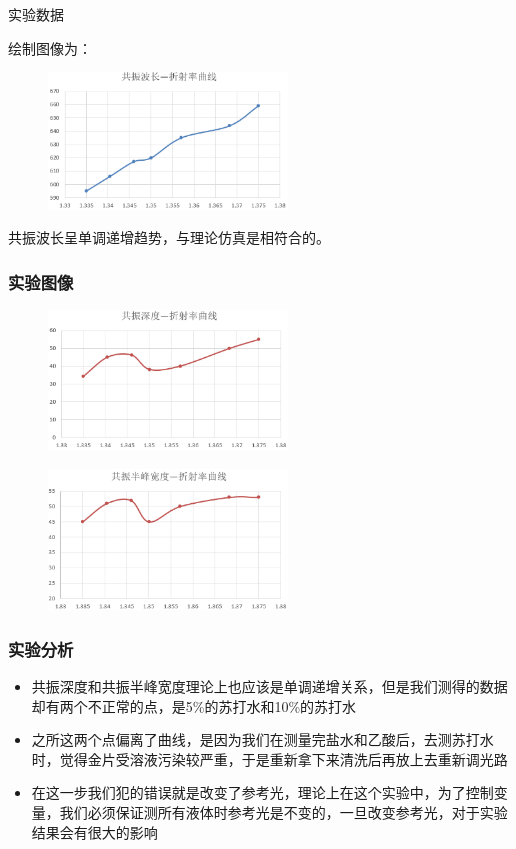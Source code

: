 \documentclass{beamer}
\begin{document}
\begin{frame}{实验数据}

  绘制图像为：
  \begin{figure}
    \includegraphics[width=180pt]{images/2_8.png}
  \end{figure}
  共振波长呈单调递增趋势，与理论仿真是相符合的。
\end{frame}

\begin{frame}
  \frametitle{实验图像}
  \begin{figure}
    \includegraphics[width=180pt]{images/2_9.png}
  \end{figure}
  \begin{figure}
    \includegraphics[width=180pt]{images/2_10.png}
  \end{figure}
\end{frame}

\begin{frame}
  \frametitle{实验分析}
  \begin{itemize}
    \item 共振深度和共振半峰宽度理论上也应该是单调递增关系，但是我们测得的数据却有两个不正常的点，是5\%的苏打水和10\%的苏打水
    \item 之所这两个点偏离了曲线，是因为我们在测量完盐水和乙酸后，去测苏打水时，觉得金片受溶液污染较严重，于是重新拿下来清洗后再放上去重新调光路
    \item 在这一步我们犯的错误就是改变了参考光，理论上在这个实验中，为了控制变量，我们必须保证测所有液体时参考光是不变的，一旦改变参考光，对于实验结果会有很大的影响
  \end{itemize}
\end{frame}
\end{document}

